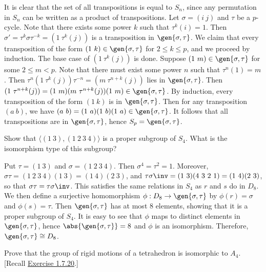 \begin{sol}
    It is clear that the set of all transpositions is equal to $S_n$, since any permutation in $S_n$ can be written as a product of transpositions. Let $\sigma = (i\ j)$ and $\tau$ be a $p$-cycle. Note that there exists some power $k$ such that $\tau^k(i) = 1$. Then $\sigma' = \tau^k\sigma\tau^{-k} = (1\ \tau^k(j))$ is a transposition in $\gen{\sigma, \tau}$. We claim that every transposition of the form $(1\ k) \in \gen{\sigma, \tau}$ for $2 \leq k \leq p$, and we proceed by induction. The base case of $(1\ \tau^k(j))$ is done. Suppose $(1\ m) \in \gen{\sigma, \tau}$ for some $2 \leq m < p$. Note that there must exist some power $n$ such that $\tau^n(1) = m$. Then $\tau^n(1\ \tau^k(j))\tau^{-n} = (m\ \tau^{n + k}(j))$ lies in $\gen{\sigma, \tau}$. Then $(1\ \tau^{n + k}(j)) = (1\ m)(m\ \tau^{n + k}(j))(1\ m) \in \gen{\sigma, \tau}$. By induction, every transposition of the form $(1\ k)$ is in $\gen{\sigma, \tau}$. Then for any transposition $(a\ b)$, we have $(a\ b) = (1\ a)(1\ b)(1\ a) \in \gen{\sigma, \tau}$. It follows that all transpositions are in $\gen{\sigma, \tau}$, hence $S_p = \gen{\sigma, \tau}$.
\end{sol}

\begin{exercise}\label{ex3.5.6}
    Show that $\langle (1\ 3),(1\ 2\ 3\ 4)\rangle$ is a proper subgroup of $S_4$. What is the isomorphism type of this subgroup?
\end{exercise}

\begin{sol}
    Put $\tau = (1\ 3)$ and $\sigma = (1\ 2\ 3\ 4)$. Then $\sigma^4 = \tau^2 = 1$. Moreover, $\sigma\tau = (1\ 2\ 3\ 4)(1\ 3) = (1\ 4)(2\ 3)$, and $\tau\sigma\inv = (1\ 3)(4\ 3\ 2\ 1) = (1\ 4)(2\ 3)$, so that $\sigma\tau = \tau\sigma\inv$. This satisfies the same relations in $S_4$ as $r$ and $s$ do in $D_8$. We then define a surjective homomorphism $\phi : D_8 \to \gen{\sigma, \tau}$ by $\phi(r) = \sigma$ and $\phi(s) = \tau$. Then $\gen{\sigma, \tau}$ has at most 8 elements, showing that it is a proper subgroup of $S_4$. It is easy to see that $\phi$ maps to distinct elements in $\gen{\sigma, \tau}$, hence $\abs{\gen{\sigma, \tau}} = 8$ and $\phi$ is an isomorphism. Therefore, $\gen{\sigma, \tau} \cong D_8$.
\end{sol}

\begin{exercise}\label{ex3.5.7}
    Prove that the group of rigid motions of a tetrahedron is isomorphic to $A_4$. [Recall \hyperref[ex1.7.20]{Exercise 1.7.20}.]
\end{exercise}


